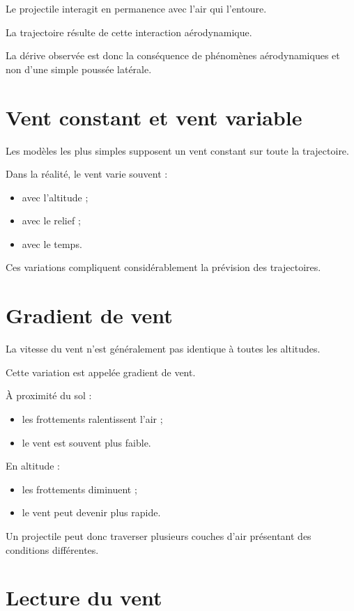 Le projectile interagit en permanence avec l'air qui l'entoure.

La trajectoire résulte de cette interaction aérodynamique.

La dérive observée est donc la conséquence de phénomènes aérodynamiques et
non d'une simple poussée latérale.

\section{Vent constant et vent variable}

Les modèles les plus simples supposent un vent constant sur toute la
trajectoire.

Dans la réalité, le vent varie souvent :

\begin{itemize}
\item avec l'altitude ;
\item avec le relief ;
\item avec le temps.
\end{itemize}

Ces variations compliquent considérablement la prévision des trajectoires.

\section{Gradient de vent}

La vitesse du vent n'est généralement pas identique à toutes les altitudes.

Cette variation est appelée gradient de vent.

À proximité du sol :

\begin{itemize}
\item les frottements ralentissent l'air ;
\item le vent est souvent plus faible.
\end{itemize}

En altitude :

\begin{itemize}
\item les frottements diminuent ;
\item le vent peut devenir plus rapide.
\end{itemize}

Un projectile peut donc traverser plusieurs couches d'air présentant des
conditions différentes.

\section{Lecture du vent}

